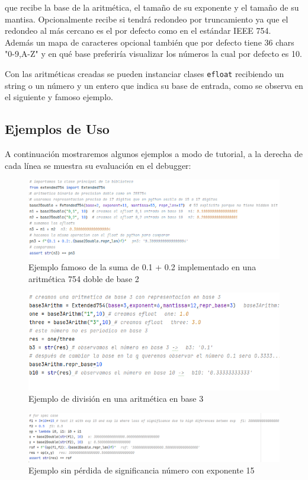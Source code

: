 \documentclass[a4paper,10pt,twocolumn]{article}
\begin{document}
	
	que recibe la base de la aritmética, el tamaño de su exponente y el tamaño de su mantisa. Opcionalmente recibe si tendrá redondeo por truncamiento ya que el redondeo al más cercano es el por defecto como en el estándar IEEE 754.\\
	
	Además un mapa de caracteres opcional también que por defecto tiene 36 chars "0-9,A-Z" y en qué base preferiría visualizar los números la cual por defecto es 10.
	
	Con las aritméticas creadas se pueden instanciar clases \texttt{efloat}  recibiendo un string o un número y un entero que indica su base de entrada, como se observa en el siguiente y famoso ejemplo.

	\onecolumn
	\subsection{Ejemplos de Uso}
	A continuación mostraremos algunos ejemplos a modo de tutorial, a la derecha de cada l\'inea se muestra su evaluación en el debugger:
	\begin{figure}[H]
		\centering
		\includegraphics[width=0.9\linewidth]{res/screenshot001}
		\caption{Ejemplo famoso de la suma de 0.1 + 0.2 implementado en una aritmética 754 doble de base 2}
	\end{figure}

\begin{figure}[H]
	\centering
	\includegraphics[width=0.9 \linewidth]{res/base3}
	\caption{Ejemplo de división en una aritmética en base 3}
	\label{fig:base3}
\end{figure}

\begin{figure}[H]
	\centering
	\includegraphics[width=0.9 \linewidth]{res/sigloss0}
	\caption{Ejemplo sin pérdida de significancia número con exponente 15}
	\label{fig:sigloss0}
\end{figure}
\end{document}
